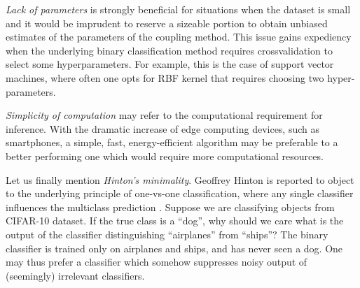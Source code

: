 \emph{Lack of parameters} is strongly beneficial for situations when the dataset is small and it would be imprudent to reserve a sizeable portion to obtain unbiased estimates of the parameters of the coupling method. This issue gains expediency when the underlying binary classification method requires crossvalidation to select some hyperparameters. For example, this is the case of support vector machines, where often one opts for RBF kernel that requires choosing two hyper-parameters. 

\emph{Simplicity of computation}  may refer to the computational requirement for inference. With the dramatic increase of edge computing devices, such as smartphones, a simple, fast, energy-efficient algorithm may be preferable to a better performing one which would require more computational resources. 

Let us finally mention \emph{Hinton's minimality}. Geoffrey Hinton is reported to object to the underlying principle of one-vs-one classification, where any single classifier influences the multiclass prediction \cite[p.~467]{hastie1998classification}. Suppose we are classifying objects from CIFAR-10 dataset.  If the true class is  a ``dog'', why should we care what is the output of the classifier distinguishing ``airplanes'' from ``ships''? The binary classifier is trained only on airplanes and ships, and has never seen a dog. One may thus prefer a classifier which somehow suppresses noisy output of (seemingly) irrelevant classifiers.



